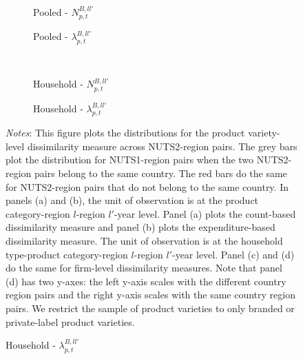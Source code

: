  \begin{figure}[H]
    \centering
    \caption{Choice set differences: Branded or Private label product varieties}
    \label{fig: app_redform_bar_bp}
    \begin{subfigure}[t]{.49\textwidth}
         \centering
         \caption{Pooled - $N^{B,ll'}_{p,t}$}
         \scalebox{0.45}{}
     \end{subfigure}
     \begin{subfigure}[t]{.49\textwidth}
         \centering
         \caption{Pooled - $\lambda^{B,ll'}_{p,t}$}
         \scalebox{0.45}{}
     \end{subfigure}\\
     \begin{subfigure}[t]{.49\textwidth}
         \centering
         \caption{Household - $N^{B,ll'}_{p,t}$}
         \scalebox{0.45}{}
     \end{subfigure}
     \begin{subfigure}[t]{.49\textwidth}
         \centering
         \caption{Household - $\lambda^{B,ll'}_{p,t}$}
         \scalebox{0.45}{}
     \end{subfigure}
     \parbox{\textwidth}{
        \begin{spacing}{1} 
            {\footnotesize 
            \textit{Notes}: This figure plots the distributions for the product variety-level dissimilarity measure across NUTS2-region pairs. The grey bars plot the distribution for NUTS1-region pairs when the two NUTS2-region pairs belong to the same country. The red bars do the same for NUTS2-region pairs that do not belong to the same country. In panels (a) and (b), the unit of observation is at the product category-region $l$-region $l'$-year level. Panel (a) plots the count-based dissimilarity measure and panel (b) plots the expenditure-based dissimilarity measure. The unit of observation is at the household type-product category-region $l$-region $l'$-year level. Panel (c) and (d) do the same for firm-level dissimilarity measures. Note that panel (d) has two y-axes: the left y-axis scales with the different country region pairs and the right y-axis scales with the same country region pairs. We restrict the sample of product varieties to only branded or private-label product varieties.}
        \end{spacing}}
 \end{figure} 

